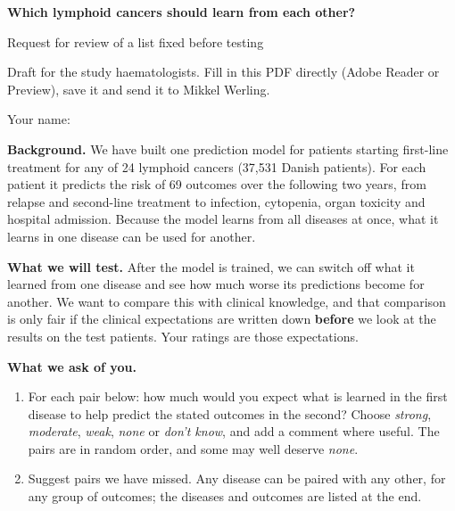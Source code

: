 \documentclass[10pt,a4paper]{article}
\begin{document}
\begin{Form}
{\Large\bfseries Which lymphoid cancers should learn from each other?}\par
{\large Request for review of a list fixed before testing}\par
{\footnotesize\color{black!55}Draft for the study haematologists. Fill in this PDF directly
(Adobe Reader or Preview), save it and send it to Mikkel Werling.}\par
Your name: \TextField[name=reviewer,width=7cm,height=1.1em,bordercolor={0.7 0.7 0.7}]{}

\textbf{Background.} We have built one prediction model for patients starting first-line treatment
for any of 24 lymphoid cancers (37,531 Danish patients). For each patient it predicts the risk of
69 outcomes over the following two years, from relapse and second-line treatment to infection,
cytopenia, organ toxicity and hospital admission. Because the model learns from all diseases at
once, what it learns in one disease can be used for another.

\textbf{What we will test.} After the model is trained, we can switch off what it learned from one
disease and see how much worse its predictions become for another. We want to compare this with
clinical knowledge, and that comparison is only fair if the clinical expectations are written down
\textbf{before} we look at the results on the test patients. Your ratings are those expectations.

\textbf{What we ask of you.}
\begin{enumerate}[leftmargin=1.4em,itemsep=1pt,topsep=0pt]
  \item For each pair below: how much would you expect what is learned in the first disease to
  help predict the stated outcomes in the second? Choose \emph{strong}, \emph{moderate},
  \emph{weak}, \emph{none} or \emph{don't know}, and add a comment where useful. The pairs are in
  random order, and some may well deserve \emph{none}.
  \item Suggest pairs we have missed. Any disease can be paired with any other, for any group of
  outcomes; the diseases and outcomes are listed at the end.
\end{enumerate}


\end{Form}
\end{document}
